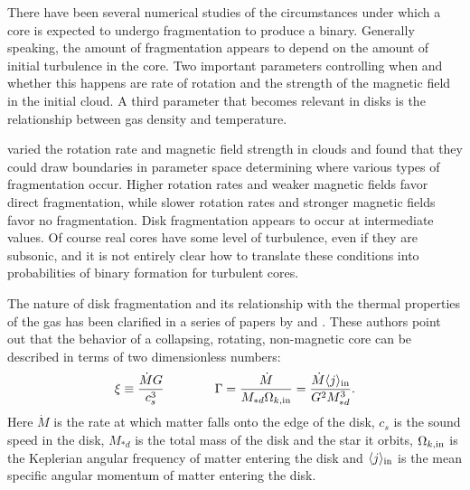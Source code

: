 There have been several numerical studies of the circumstances under which a core is expected to undergo fragmentation to produce a binary. Generally speaking, the amount of fragmentation appears to depend on the amount of initial turbulence in the core. Two important parameters controlling when and whether this happens are rate of rotation and the strength of the magnetic field in the initial cloud. A third parameter that becomes relevant in disks is the relationship between gas density and temperature.

\citet{machida08b} varied the rotation rate and magnetic field strength in clouds and found that they could draw boundaries in parameter space determining where various types of fragmentation occur. Higher rotation rates and weaker magnetic fields favor direct fragmentation, while slower rotation rates and stronger magnetic fields favor no fragmentation. Disk fragmentation appears to occur at intermediate values. Of course real cores have some level of turbulence, even if they are subsonic, and it is not entirely clear how to translate these conditions into probabilities of binary formation for turbulent cores.

The nature of disk fragmentation and its relationship with the thermal properties of the gas has been clarified in a series of papers by \citet{kratter06a} and \citet{kratter08a, kratter10a}. These authors point out that the behavior of a collapsing, rotating, non-magnetic core can be described in terms of two dimensionless numbers:
\begin{equation}
\xi \equiv \frac{\dot{M} G}{c_s^3} \qquad\qquad \Gamma = \frac{\dot{M}}{M_{*d}\Omega_{k,\rm in}} = \frac{\dot{M} \langle j\rangle_{\rm in}}{G^2 M_{*d}^3}.
\end{equation}
Here $\dot{M}$ is the rate at which matter falls onto the edge of the disk, $c_s$ is the sound speed in the disk, $M_{*d}$ is the total mass of the disk and the star it orbits, $\Omega_{k,\rm in}$ is the Keplerian angular frequency of matter entering the disk and $\langle j\rangle_{\rm in}$ is the mean specific angular momentum of matter entering the disk.

